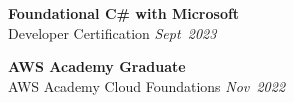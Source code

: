 \documentclass[../main.tex]{subfiles}
\begin{document}
\begingroup
\fontsize{8.5pt}{11.5pt}\selectfont
\textbf{Foundational C\# with Microsoft} \\
Developer Certification \hfill \textit{Sept~2023} \\
\sectionsep

\textbf{AWS Academy Graduate} \\
AWS Academy Cloud Foundations \hfill \textit{Nov~2022}
\endgroup
\end{document}
